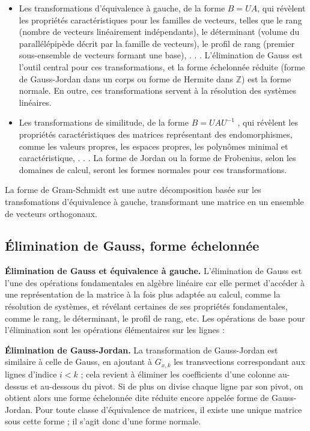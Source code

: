 \begin{itemize}
 	 \item Les transformations d’équivalence à gauche, de la forme $B = UA$, qui
révèlent les propriétés caractéristiques pour les familles de vecteurs, telles
que le rang (nombre de vecteurs linéairement indépendants), le déterminant
(volume du parallélépipède décrit par la famille de vecteurs), le profil de rang
(premier sous-ensemble de vecteurs formant une base), . . . L’élimination de
Gauss est l’outil central pour ces transformations, et la forme échelonnée
réduite (forme de Gauss-Jordan dans un corps ou forme de Hermite dans $\mathbb{Z}$)
est la forme normale. En outre, ces transformations servent à la résolution
des systèmes linéaires.
	 \item  Les transformations de similitude, de la forme $B = UAU^{-1}$ , qui révèlent les
propriétés caractéristiques des matrices représentant des endomorphismes,
comme les valeurs propres, les espaces propres, les polynômes minimal et
caractéristique, . . . La forme de Jordan ou la forme de Frobenius, selon les
domaines de calcul, seront les formes normales pour ces transformations.

\end{itemize}

La forme de Gram-Schmidt est une autre décomposition basée sur les transfomations d’équivalence à gauche, transformant une matrice en un ensemble de vecteurs orthogonaux.

\subsection{ Élimination de Gauss, forme échelonnée}
\textbf{Élimination de Gauss et équivalence à gauche.} L’élimination de Gauss est l’une des opérations fondamentales en algèbre linéaire car elle permet d’accéder à une représentation de la matrice à la fois plus adaptée au calcul, comme la résolution de systèmes, et révélant certaines de ses propriétés fondamentales,
comme le rang, le déterminant, le profil de rang, etc. Les opérations de base pour l’élimination sont les opérations élémentaires sur les lignes :

\textbf{Élimination de Gauss-Jordan.} La transformation de Gauss-Jordan est similaire à celle de Gauss, en ajoutant à $G_{x,k}$ les transvections correspondant aux lignes d’indice $i < k$ ; cela revient à éliminer les coefficients d’une colonne au-dessus et au-dessous du pivot. Si de plus on divise chaque ligne par son pivot, on obtient alors une forme échelonnée dite réduite encore appelée forme de Gauss-Jordan. Pour toute classe d’équivalence de matrices, il existe une unique matrice sous cette forme ; il s’agit donc d’une forme normale.

